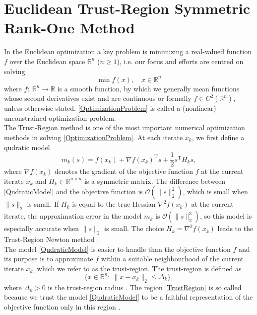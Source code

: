 \chapter{Euclidean Trust-Region Symmetric Rank-One Method}

In the Euclidean optimization a key problem is minimizing a real-valued function $f$ over the Euclidean space $\mathbb{R}^n$ ($n \geq 1$), i.e. our focus and efforts are centred on solving 
\begin{equation}\label{OptimizationProblem}
    \min f(x), \quad x \in \mathbb{R}^n
\end{equation}  
where $f \colon \ \mathbb{R}^n \to \mathbb{R}$ is a smooth function, by which we generally mean functions whose second derivatives exist and are continuous or formally $f \in C^2(\mathbb{R}^n)$, unless otherwise stated. \cref{OptimizationProblem} is called a (nonlinear) unconstrained optimization problem. \\
The Trust-Region method is one of the most important numerical optimization methods in solving \cref{OptimizationProblem}. At each iterate $x_k$, we first define a qudratic model 
\begin{equation}\label{QudraticModel}
    m_k(s) = f(x_k) + \nabla f(x_k)^{\mathrm{T}} s + \frac{1}{2} s^{\mathrm{T}} H_k s,
\end{equation}
where $\nabla f(x_k)$ denotes the gradient of the objective function $f$ at the current iterate $x_k$ and $H_k \in  \mathbb{R}^{n \times n}$ is a symmetric matrix. The difference between \cref{QudraticModel} and the objective function is $\mathcal{O}(\lVert s \rVert^{2}_2)$, which is small when $\lVert s \rVert_2$ is small. If $H_k$ is equal to the true Hessian $\nabla^2 f(x_k)$ at the current iterate, the approximation error in the model $m_k$ is $\mathcal{O}(\lVert s \rVert^{3}_2)$, so this model is especially accurate when $\lVert s \rVert_2$ is small. The choice $H_k = \nabla^2 f(x_k)$ leads to the Trust-Region Newton method \cite[p.~68]{NocedalWright:2006}. \\
The model \cref{QudraticModel} is easier to handle than the objective function $f$ and its purpose is to approximate $f$ within a suitable neighbourhood of the current iterate $x_k$, which we refer to as the trust-region. The trust-region is defined as
\begin{equation}\label{TrustRegion}
    \{ x \in \mathbb{R}^n \colon \ \lVert x - x_k \rVert_2 \leq \Delta_k \},
\end{equation}
where $\Delta_k > 0$ is the trust-region radius \cite[p.~115]{ConnGouldToint:2000}. The region \cref{TrustRegion} is so called because we trust the model \cref{QudraticModel} to be a faithful representation of the objective function only in this region \cite[p.~2]{ConnGouldToint:2000}. \\
